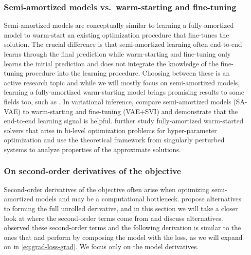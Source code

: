 \documentclass[twoside,11pt]{article}
\begin{document}
\subsubsection{Semi-amortized models vs.~warm-starting and fine-tuning}
Semi-amortized models are conceptually similar to learning a fully-amortized model
to warm-start an existing optimization procedure that fine-tunes the solution.
The crucial difference is that semi-amortized learning often end-to-end learns
through the final prediction while warm-starting and fine-tuning only learns
the initial prediction and does not integrate the knowledge of the fine-tuning
procedure into the learning procedure.
Choosing between these is an active research topic and while we will
mostly focus on semi-amortized models, learning a fully-amortized
warm-starting model brings promising results to some fields too,
such as \citet{zhang2019safe,baker2019learning,chen2022large}.
In variational inference, \citet[Table 2]{kim2018semi} compare semi-amortized
models (SA-VAE) to warm-starting and fine-tuning (VAE+SVI) and demonstrate
that the end-to-end learning signal is helpful.
\citet{arbel2021amortized} further study fully-amortized warm-started
solvers that arise in bi-level optimization problems for
hyper-parameter optimization and use the theoretical framework from
singularly perturbed systems \citep{habets2010stabilite}
to analyze properties of the approximate solutions.

\subsubsection{On second-order derivatives of the objective}
\label{sec:second-derivatives}
Second-order derivatives of the objective often arise when optimizing
semi-amortized models and may be a computational bottleneck.
\citet{finn2017model,nichol2018first,lorraine2020optimizing}
propose alternatives to forming the full unrolled derivative,
and in this section we will take a closer look at where the
second-order terms come from and discuss alternatives.
\citet{finn2017model} observed these second-order terms and
the following derivation is similar to the ones that
\citet[\S5]{nichol2018first} and \citet{weng2018metalearning}
perform by composing the model with the loss, as we will expand on
in \cref{eq:grad-loss-grad}. We focus only on the
model derivatives.
\end{document}
